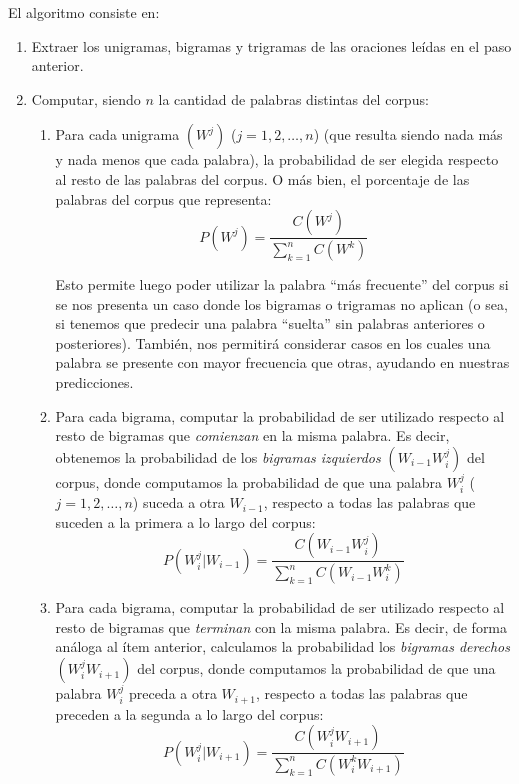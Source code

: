 \documentclass[a4paper]{article}
\begin{document}
\noindent El algoritmo consiste en:

\begin{enumerate}
    \item Extraer los unigramas, bigramas y trigramas de las oraciones leídas en el paso anterior.
    \item Computar, siendo $n$ la cantidad de palabras distintas del corpus:
        \begin{enumerate}
            \item Para cada unigrama $(W^j)$ ($j = 1,2,\dots,n$) (que resulta siendo nada más y nada menos que cada palabra), la probabilidad de ser elegida respecto al resto de las palabras del corpus. O más bien, el porcentaje de las palabras del corpus que representa:
            \[
                P(W^j) = \frac{C(W^j)}{\sum_{k=1}^n C(W^k)}
            \]

            Esto permite luego poder utilizar la palabra ``más frecuente'' del corpus si se nos presenta un caso donde los bigramas o trigramas no aplican (o sea, si tenemos que predecir una palabra ``suelta'' sin palabras anteriores o posteriores). También, nos permitirá considerar casos en los cuales una palabra se presente con mayor frecuencia que otras, ayudando en nuestras predicciones.

        \item Para cada bigrama, computar la probabilidad de ser utilizado respecto al resto de bigramas que \textit{comienzan} en la misma palabra. Es decir, obtenemos la probabilidad de los \textit{bigramas izquierdos} $(W_{i-1} W_i^j)$ del corpus, donde computamos la probabilidad de que una palabra $W_i^j$ ($j = 1,2,\dots,n$) suceda a otra $W_{i-1}$, respecto a todas las palabras que suceden a la primera a lo largo del corpus:
            \[
                P(W_i^j|W_{i-1}) = \frac{C(W_{i-1} W_i^j)}{\sum_{k=1}^n C(W_{i-1} W_i^k)}
            \]

        \item Para cada bigrama, computar la probabilidad de ser utilizado respecto al resto de bigramas que \textit{terminan} con la misma palabra. Es decir, de forma análoga al ítem anterior, calculamos la probabilidad los \textit{bigramas derechos} $(W_i^j W_{i+1})$ del corpus, donde computamos la probabilidad de que una palabra $W_i^j$ preceda a otra $W_{i+1}$, respecto a todas las palabras que preceden a la segunda a lo largo del corpus:
            \[
               P(W_i^j|W_{i+1}) = \frac{C(W_i^j W_{i+1})}{\sum_{k=1}^n C(W_i^k W_{i+1})}
            \]
        

\end{enumerate}
\end{enumerate}
\end{document}
